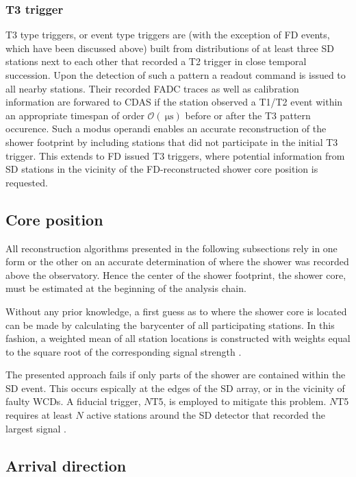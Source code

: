 \subsubsection{T3 trigger}
\label{sssec:t3-trigger}

T3 type triggers, or event type triggers are (with the exception of FD events, which have been discussed above) built from distributions of at least three SD 
stations next to each other that recorded a T2 trigger in close temporal succession. Upon the detection of such a pattern a readout command is issued to all nearby 
stations. Their recorded FADC traces as well as calibration information are forwared to CDAS if the station observed a T1/T2 event within an appropriate timespan 
of order $\mathcal{O}(\SI{}{\micro\second})$ before or after the T3 pattern occurence. Such a modus operandi enables an accurate reconstruction of the shower 
footprint by including stations that did not participate in the initial T3 trigger. This extends to FD issued T3 triggers, where potential information from SD 
stations in the vicinity of the FD-reconstructed shower core position is requested.

\subsection{Core position}
\label{ssec:core-position}

All reconstruction algorithms presented in the following subsections rely in one form or the other on an accurate determination of where the shower was recorded 
above the observatory. Hence the center of the shower footprint, the shower core, must be estimated at the beginning of the analysis chain. 

Without any prior knowledge, a first guess as to where the shower core is located can be made by calculating the barycenter of all participating stations. In this 
fashion, a weighted mean of all station locations is constructed with weights equal to the square root of the corresponding signal strength \cite{SDReconstruction}.

The presented approach fails if only parts of the shower are contained within the SD event. This occurs espically at the edges of the SD array, or in the vicinity
of faulty WCDs. A fiducial trigger, $N$T5, is employed to mitigate this problem. $N$T5 requires at least $N$ active stations around the SD detector that recorded 
the largest signal \cite{abraham2010trigger}.

\subsection{Arrival direction}
\label{ssec:arrival-direction}

